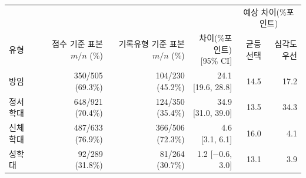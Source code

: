 \begin{tabular}{lrrrrr}
\toprule
 & & & & \multicolumn{2}{c}{예상 차이(\%포인트)} \\ \cmidrule(l){5-6}
유형 & \makecell{점수 기준 표본\\$m/n$ (\%)} & \makecell{기록유형 기준\\표본 $m/n$ (\%)} & \makecell{차이(\%포인트)\\{[95\% CI]}} & \makecell{균등\\선택} & \makecell{심각도\\우선} \\
\midrule
방임 & \makecell{350/505\\(69.3\%)} & \makecell{104/230\\(45.2\%)} & \makecell{24.1\\{[19.6, 28.8]}} & 14.5 & 17.2 \\
정서학대 & \makecell{648/921\\(70.4\%)} & \makecell{124/350\\(35.4\%)} & \makecell{34.9\\{[31.0, 39.0]}} & 13.5 & 34.3 \\
신체학대 & \makecell{487/633\\(76.9\%)} & \makecell{366/506\\(72.3\%)} & \makecell{4.6\\{[3.1, 6.1]}} & 16.0 & 4.1 \\
성학대 & \makecell{92/289\\(31.8\%)} & \makecell{81/264\\(30.7\%)} & \makecell{1.2\\{[$-$0.6, 3.0]}} & 13.1 & 3.9 \\
\bottomrule
\end{tabular}
